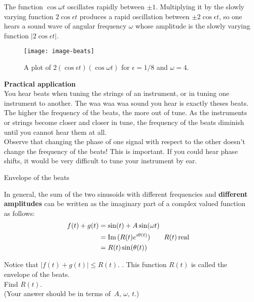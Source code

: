 The function $\cos \omega t$ oscillates rapidly between $\pm 1$.
Multiplying it by the slowly varying function $2 \cos \epsilon t$ produces a rapid oscillation between
$\pm 2 \cos \epsilon t$, so one hears a sound wave of angular frequency $\omega$
whose amplitude is the slowly varying function $|2 \cos \epsilon t|$.



\begin{figure}[ht!]
  \centering
  \texttt{[image: image-beats]}
  \caption{A plot of $2\left(\cos \epsilon t\right)\left(\cos \omega t\right)$
  for $\epsilon =1/8$ and $\omega =4$.}
\end{figure}

\textbf{Practical application}\\

You hear beats when tuning the strings of an instrument, or in tuning one instrument to another.
The waa waa waa sound you hear is exactly theses beats.
The higher the frequency of the beats, the more out of tune.
As the instruments or strings become closer and closer in tune,
the frequency of the beats diminish until you cannot hear them at all. \\
Observe that changing the phase of one signal with respect to the other doesn't change
the frequency of the beats!
This is important. If you could hear phase shifts,
it would be very difficult to tune your instrument by ear.\\

\begin{exercise}
  Envelope of the beats
\end{exercise}
In general, the sum of the two sinusoids with different frequencies and
\textbf{different amplitudes} can be written as the imaginary part of a complex valued function as follows:
\begin{align*}
  \displaystyle  \displaystyle f(t)+g(t)
  \displaystyle &= \displaystyle \sin (t)+A \sin (\omega t) \\
  \displaystyle &= \displaystyle  \mathrm{Im\, }( R(t) e^{i \theta (t)}) \qquad R(t) \, \text {real} \\
  \displaystyle &= \displaystyle  R(t) \sin (\theta (t))
\end{align*}

Notice that $|f(t)+g(t)|\leq R(t).\, \,$. This function $R(t)$ is called the
{\color{blue}envelope of the beats}.\\

Find $R(t)$.\\
(Your answer should be in terms of $\, A,\, \omega ,\, t.$)

